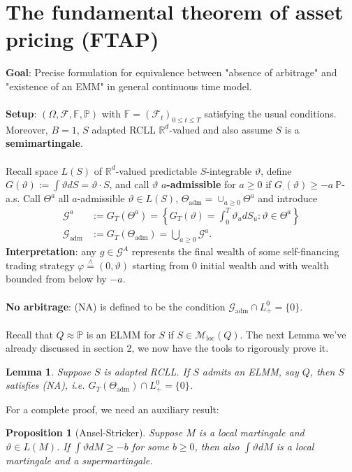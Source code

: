\documentclass[12pt,a4paper, twoside]{article}
\newtheorem{lem}{Lemma}[section]
\newtheorem{prop}{Proposition}[section]
\theoremstyle{definition}
\newcommand{\PP}{\mathbb{P}} %
\newcommand{\teq}{\overset{\wedge}{=}}
\begin{document}
\section{The fundamental theorem of asset pricing (FTAP)}
\textbf{Goal}: Precise formulation for equivalence between "absence of arbitrage" and "existence of an EMM" in general continuous time model. 
\\\\
\textbf{Setup}: $( \Omega, \mathcal{F}, \mathbb{F}, \PP)$ with $\mathbb{F}= ( \mathcal{F}_t)_{0 \leq t \leq T}$ satisfying the usual conditions. Moreover, $B=1$, $S$ adapted RCLL $\mathbb{R}^d$-valued and also assume $S$ is a \textbf{semimartingale}.\\
\\
Recall space $L(S)$ of $\mathbb{R}^d$-valued predictable $S$-integrable $\vartheta$, define $G( \vartheta):= \int \vartheta dS = \vartheta \cdot S$, and call $\vartheta$ \textbf{$a$-admissible} for $a \geq 0$ if $G_\cdot ( \vartheta) \geq -a \ \PP$-a.s. Call $\Theta^a$ all $a$-admissible $\vartheta \in L(S)$, $\Theta_\text{adm} = \cup_{a \geq 0 } \Theta^a$ and introduce 
\begin{align*}
\mathcal{G}^a &:= G_T( \Theta^a) = \left\{ G_T( \vartheta) = \int_0^T \vartheta_u dS_u : \vartheta \in \Theta^a \right\} \\
\mathcal{G}_\text{adm}&:= G_T( \Theta_\text{adm}) = \bigcup_{a \geq 0} \mathcal{G}^a.
\end{align*}
\textbf{Interpretation}: any $g \in \mathcal{G}^A$ represents the final wealth of some self-financing trading strategy $\varphi \teq ( 0, \vartheta)$ starting from $0$ initial wealth and with wealth bounded from below by $-a$. 
\\
\\
\textbf{No arbitrage}: (NA) is defined to be the condition $\mathcal{G}_\text{adm} \cap L_+^0 = \{0 \}$.
\\\\
Recall that $Q \approx \PP$ is an ELMM for $S$ if $S \in \mathcal{M}_\text{loc}(Q)$. The next Lemma we've already discussed in section 2, we now have the tools to rigorously prove it. 
\begin{lem}\label{L41} Suppose $S$ is adapted RCLL. If $S$ admits an ELMM, say $Q$, then $S$ satisfies (NA), i.e. $G_T( \Theta_\text{adm}) \cap L_+^0 = \{0 \}$. 
\end{lem}
For a complete proof, we need an auxiliary result: 
\begin{prop}[Ansel-Stricker] \label{P41} Suppose $M$ is a local martingale and $\vartheta \in L(M)$. If $\int \vartheta dM \geq -b$ for some $b \geq 0$, then also $\int \vartheta dM$ is a local martingale and a supermartingale. 
\end{prop}
\end{document}

